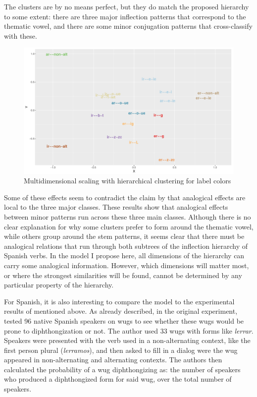 \largerpage 
The clusters are by no means perfect, but they do match the proposed hierarchy to some extent: there are three major inflection patterns that correspond to the thematic vowel, and there are some minor conjugation patterns that cross-classify with these.

\begin{figure}
  \centering
  \includegraphics[scale=0.68, angle=90]{./figures/spanish/spanish-verbs-clust-sim1.pdf}
  \caption{Multidimensional scaling with hierarchical clustering for label colors}\label{fig:sp-fanny-infl}
\end{figure}

Some of these effects seem to contradict the claim by \textcite{Albright.2009} that analogical effects are local to the three major classes. These results show that analogical effects between minor patterns run across these three main classes. Although there is no clear explanation for why some clusters prefer to form around the thematic vowel, while others group around the stem patterns, it seems clear that there must be analogical relations that run through both subtrees of the inflection hierarchy of Spanish verbs. In the model I propose here, all dimensions of the hierarchy can carry some analogical information. However, which dimensions will matter most, or where  the strongest similarities will be found, cannot be determined by any particular property of the hierarchy.

For Spanish, it is also interesting to compare the model to the experimental results of \textcite{Albright.2009} mentioned above. As already described, in the original experiment, \textcite{Albright.2001} tested 96 native Spanish speakers on wugs to see whether these wugs would be prone to diphthongization or not. The author used 33 wugs with forms like \textit{lerrar}. Speakers were presented with the verb used in a non-alternating context, like the first person plural (\textit{lerramos}), and then asked to fill in a dialog were the wug appeared in non-alternating and alternating contexts. The authors then calculated the probability of a wug diphthongizing as: the number of speakers who produced a diphthongized form for said wug, over the total number of speakers.

